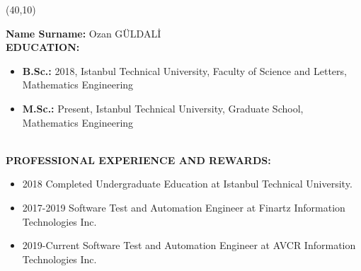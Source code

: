 \vspace{10mm}

\newsavebox{\mysquare}
\savebox{\mysquare}{\textcolor{black}{\rule[2.3pt]{3.4pt}{3.4pt}}}

\setlength{\TPHorizModule}{10pt}
\setlength{\TPVertModule}{10pt}
\begin{textblock}{1}(40,10)
	
	\begin{comment}
	\begin{figure}[p]
	\texttt{[image: fig/vesikalık.jpeg]}
	\end{figure}
	\end{comment}
	
\end{textblock}
\textbf{Name Surname:} Ozan GÜLDALİ\\ 




\textbf{EDUCATION:}
\begin{itemize}
	\item \textbf{B.Sc.:} 2018, Istanbul Technical University, Faculty of Science and Letters, Mathematics Engineering
	\item \textbf{M.Sc.:} Present, Istanbul Technical University, Graduate School, Mathematics Engineering
\end{itemize}

\textbf{ }\\

\textbf{PROFESSIONAL EXPERIENCE AND REWARDS:}
\begin{itemize}
	\item 2018 Completed Undergraduate Education at Istanbul Technical University.
	\item 2017-2019 Software Test and Automation Engineer at Finartz Information Technologies Inc.
	\item 2019-Current Software Test and Automation Engineer at AVCR Information Technologies Inc.
\end{itemize}

